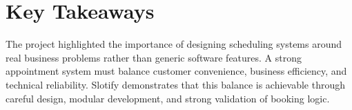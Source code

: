 \section{Key Takeaways}
The project highlighted the importance of designing scheduling systems around real business problems rather than generic software features. A strong appointment system must balance customer convenience, business efficiency, and technical reliability. Slotify demonstrates that this balance is achievable through careful design, modular development, and strong validation of booking logic.
